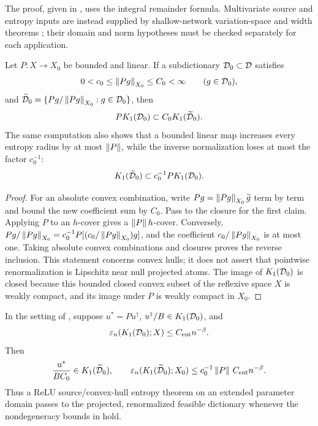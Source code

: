 The proof, given in , uses the integral remainder formula. Multivariate source and
entropy inputs are instead supplied by shallow-network variation-space and width theorems
\citep{SiegelXuVariation2023,SiegelXuSharp2024,MaoSiegelXu2026}; their domain and norm hypotheses
must be checked separately for each application.

\begin{lemma}
\label{lem:projection}
Let \(P:X\to X_0\) be bounded and linear. If a subdictionary \(\mathcal{D}_0\subset\mathcal{D}\) satisfies
\[
 0<c_0\leq\left\lVert Pg\right\rVert_{X_0}\leq C_0<\infty\qquad(g\in\mathcal{D}_0),
\]
and \(\widetilde{\mathcal{D}}_0=\{Pg/\left\lVert Pg\right\rVert_{X_0}:g\in\mathcal{D}_0\}\), then
\[
 P K_1(\mathcal{D}_0)\subset C_0K_1(\widetilde{\mathcal{D}}_0).
\]
The same computation also shows that a bounded linear map increases every entropy radius by at most
\(\left\lVert P\right\rVert\), while the inverse normalization loses at most the factor \(c_0^{-1}\):
\[
 K_1(\widetilde{\mathcal{D}}_0)\subset c_0^{-1}P K_1(\mathcal{D}_0).
\]
\end{lemma}

\begin{proof}
For an absolute convex combination, write
\(Pg=\left\lVert Pg\right\rVert_{X_0}\widetilde g\) term by term and bound the new coefficient sum by \(C_0\).
Pass to the closure for the first claim. Applying \(P\) to an \(h\)-cover gives a
\(\left\lVert P\right\rVert h\)-cover. Conversely,
\(Pg/\left\lVert Pg\right\rVert_{X_0}=c_0^{-1}P[(c_0/\left\lVert Pg\right\rVert_{X_0})g]\), and the coefficient
\(c_0/\left\lVert Pg\right\rVert_{X_0}\) is at most one. Taking absolute convex combinations and closures proves the
reverse inclusion. This statement concerns convex hulls; it does not assert that pointwise
renormalization is Lipschitz near null projected atoms. The image of \(K_1(\mathcal{D}_0)\) is closed because
this bounded closed convex subset of the reflexive space \(X\) is weakly compact, and its image
under \(P\) is weakly compact in \(X_0\).
\end{proof}

\begin{corollary}
\label{cor:projected-source-entropy}
In the setting of , suppose \(u^*=Pu^\dagger\),
\(u^\dagger/B\in K_1(\mathcal{D}_0)\), and
\[
 \varepsilon_n(K_1(\mathcal{D}_0);X)\leq C_{\rm ent}n^{-\beta}.
\]
Then
\[
 \frac{u^*}{BC_0}\in K_1(\widetilde{\mathcal{D}}_0),
 \qquad
 \varepsilon_n(K_1(\widetilde{\mathcal{D}}_0);X_0)
 \leq c_0^{-1}\left\lVert P\right\rVert\,C_{\rm ent}n^{-\beta}.
\]
Thus a ReLU source/convex-hull entropy theorem on an extended parameter domain passes to the projected,
renormalized feasible dictionary whenever the nondegeneracy bounds in  hold.
\end{corollary}

